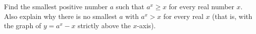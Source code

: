 Find the smallest positive number $a$ such that $a^x\ge x$ for every real number $x$. Also explain why there is no smallest $a$ with $a^x>x$ for every real $x$ (that is, with the graph of $y=a^x-x$ strictly above the $x$-axis).
